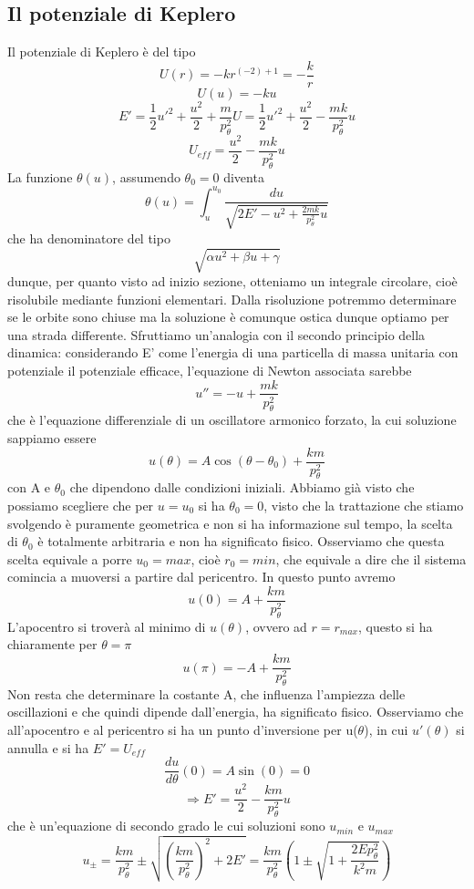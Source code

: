 \documentclass[
10pt, %
a4paper, %
oneside, %
headinclude,footinclude, %
BCOR5mm, %
]{scrartcl}
\begin{document}
\subsection{Il potenziale di Keplero}
Il potenziale di Keplero è del tipo
\[U(r) = -kr^{(-2)+1} =-\frac{k}{r}\]
\[U(u) = -ku\]
\[E' = \frac{1}{2}u'^2+\frac{u^{2}}{2}+\frac{m}{p_\theta^2}U =\frac{1}{2}u'^2+\frac{u^{2}}{2}-\frac{mk}{p_\theta^2}u\]
\[U_{eff} = \frac{u^{2}}{2}-\frac{mk}{p_\theta^2}u\]
La funzione \(\theta(u)\), assumendo \(\theta_0 = 0\) diventa
\[\theta(u) = \int^{u_0}_{u}\frac{du}{\sqrt{2E'-u^{2}+\frac{2mk}{p_\theta^2}u}}\]
che ha denominatore del tipo
\[\sqrt{\alpha u^2+\beta u + \gamma}\]
dunque, per quanto visto ad inizio sezione, otteniamo un integrale circolare, cioè risolubile mediante funzioni elementari. Dalla risoluzione potremmo determinare se le orbite sono chiuse ma la soluzione è comunque ostica dunque optiamo per una strada differente. Sfruttiamo un'analogia con il secondo principio della dinamica: considerando E' come l'energia di una particella di massa unitaria con potenziale il potenziale efficace, l'equazione di Newton associata sarebbe
\[u'' = -u + \frac{mk}{p_\theta^2}\]
che è l'equazione differenziale di un oscillatore armonico forzato, la cui soluzione sappiamo essere
\[u(\theta) = A\cos(\theta-\theta_0)+\frac{km}{p_\theta^2}\]
con A e $\theta_0$ che dipendono dalle condizioni iniziali. Abbiamo già visto che possiamo scegliere che per \(u = u_0\) si ha $\theta_0 = 0$, visto che la trattazione che stiamo svolgendo è puramente geometrica e non si ha informazione sul tempo, la scelta di $\theta_0$ è totalmente arbitraria e non ha significato fisico. Osserviamo che questa scelta equivale a porre \(u_0=max\), cioè \(r_0 = min\), che equivale a dire che il sistema comincia a muoversi a partire dal pericentro.
In questo punto avremo
\[u(0) = A+\frac{km}{p_\theta^2}\]
L'apocentro si troverà al minimo di \(u(\theta)\), ovvero ad \(r = r_{max}\), questo si ha chiaramente per $\theta = \pi$
\[u(\pi) = -A + \frac{km}{p_\theta^2}\]
Non resta che determinare la costante A, che influenza l'ampiezza delle oscillazioni e che quindi dipende dall'energia, ha significato fisico. Osserviamo che all'apocentro e al pericentro si ha un punto d'inversione per u($\theta$), in cui \(u'(\theta)\) si annulla e si ha \(E'=U_{eff}\)
\[\frac{du}{d\theta}(0) = A\sin(0) = 0\]
\[\Rightarrow E' = \frac{u^{2}}{2}-\frac{km}{p_\theta^2}u\]
che è un'equazione di secondo grado le cui soluzioni sono \(u_{min}\) e \(u_{max}\)
\[u_\pm = \frac{km}{p_\theta^2} \pm \sqrt{\left(\frac{km}{p_\theta^2}\right)^2+2E'} = \frac{km}{p_\theta^2}\left(1\pm\sqrt{1+\frac{2Ep_\theta^2}{k^2m}}\right)\]
\end{document}
